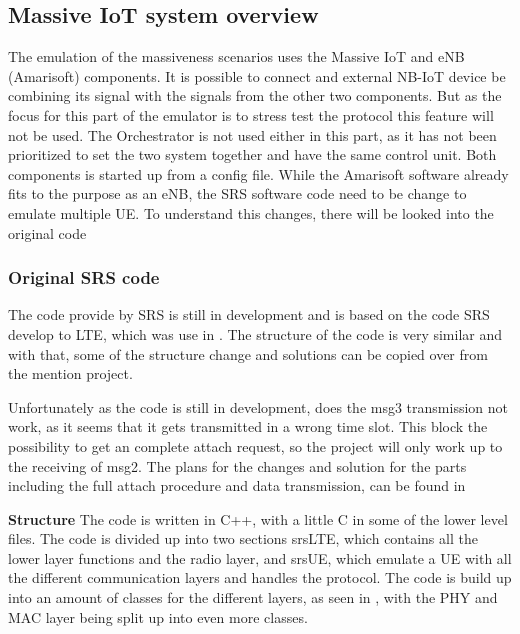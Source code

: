 \subsection{Massive IoT system overview}

The emulation of the massiveness scenarios uses the Massive IoT and eNB (Amarisoft) components. It is possible to connect and external NB-IoT device be combining its signal with the signals from the other two components. But as the focus for this part of the emulator is to stress test the protocol this feature will not be used. The Orchestrator is not used either in this part, as it has not been prioritized to set the two system together and have the same control unit. Both components is started up from a config file. While the Amarisoft software already fits to the purpose as an eNB, the SRS software code need to be change to emulate multiple UE. To understand this changes, there will be looked into the original code

\subsubsection{Original SRS code}
The code provide by SRS is still in development and is based on the code SRS develop to LTE, which was use in . The structure of the code is very similar and with that, some of the structure change and solutions can be copied over from the mention project.

Unfortunately as the code is still in development, does the msg3 transmission not work, as it seems that it gets transmitted in a wrong time slot.  This block the possibility to get an complete attach request, so the project will only work up to the receiving of msg2. The plans for the changes and solution for the parts including the full attach procedure and data transmission, can be found in 

\textbf{Structure}
The code is written in C++, with a little C in some of the lower level files. The code is divided up into two sections srsLTE, which contains all the lower layer functions and the radio layer, and srsUE, which emulate a UE with all the different communication layers and handles the protocol. The code is build up into an amount of classes for the different layers, as seen in , with the PHY and MAC layer being split up into even more classes.

